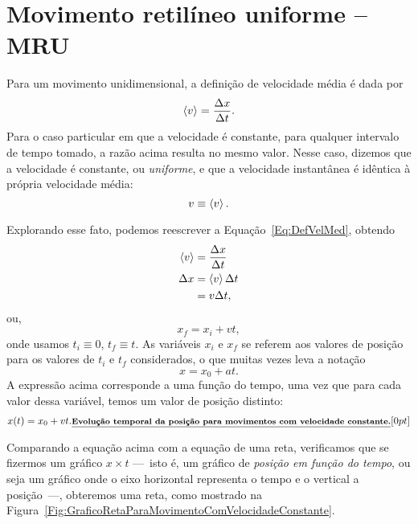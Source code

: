 \section{Movimento retilíneo uniforme -- MRU}

Para um movimento unidimensional, a definição de velocidade média é dada por
\begin{equation}\label{Eq:DefVelMed}
    \left\langle{v}\right\rangle = \frac{\Delta x}{\Delta t}.
\end{equation}
%
Para o caso particular em que a velocidade é constante, para qualquer intervalo de tempo tomado, a razão acima resulta no mesmo valor. Nesse caso, dizemos que a velocidade é constante, ou \emph{uniforme}, e que a velocidade instantânea é idêntica à própria velocidade média:
\begin{equation}
    v \equiv \left\langle{v}\right\rangle.
\end{equation}

Explorando esse fato, podemos reescrever a Equação~\eqref{Eq:DefVelMed}, obtendo
\begin{align}
    \left\langle{v}\right\rangle &= \frac{\Delta x}{\Delta t} \\
    \Delta x &= \left\langle{v}\right\rangle \Delta t \\
    &= v \Delta t,
\end{align}
%
ou,
\begin{equation}
    x_f = x_i + v t,
\end{equation}
%
onde usamos $t_i \equiv 0$, $t_f \equiv t$. As variáveis $x_i$ e $x_f$ se referem aos valores de posição para os valores de $t_i$ e $t_f$ considerados, o que muitas vezes leva a notação
\begin{equation}
    x = x_0 + at.
\end{equation}
%
A expressão acima corresponde a uma função do tempo, uma vez que para cada valor dessa variável, temos um valor de posição distinto:
\begin{align}
    x(t) = x_0 + v t. \relax{\footnotesize\emph{\textbf{Evolução temporal da posição para movimentos com velocidade constante.}}}[0pt]
\end{align}

Comparando a equação acima com a equação de uma reta, verificamos que se fizermos um gráfico $x \times t$ ---~isto é, um gráfico de \emph{posição em função do tempo}, ou seja um gráfico onde o eixo horizontal representa o tempo e o vertical a posição~---, obteremos uma reta, como mostrado na Figura~\ref{Fig:GraficoRetaParaMovimentoComVelocidadeConstante}.

